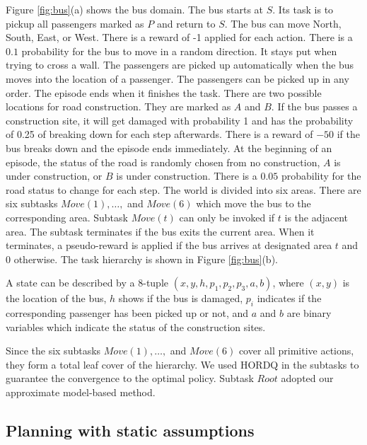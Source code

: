 Figure \ref{fig:bus}(a) shows the bus domain. The bus starts at $S$. Its task
is to pickup all passengers marked as $P$ and return to $S$.
The bus can move North, South, East, or West. There is a reward of -1 applied for each action.
There is a $0.1$ probability for the bus to move in a random direction. It stays put 
when trying to cross a wall. 
The passengers are picked up automatically when the bus moves into
the location of a passenger. The passengers can be picked up in any order.
The episode ends when it finishes the task.  
There are two possible locations for road construction. They are marked as 
$A$ and $B$. If the bus passes a construction site, it will get damaged with probability 1 and has the probability
of 0.25 of breaking down for each step afterwards. There is a reward of $-50$ if the bus breaks down and the episode ends immediately. 
At the beginning of an episode, the status of the road is randomly chosen from no construction, $A$ is under construction,
or $B$ is under construction. There is a $0.05$ probability for the road status to change for each step.
The world is divided into six areas. There are six subtasks $Move(1), \dots,$ and $Move(6)$ which move the
bus to the corresponding area.
Subtask $Move(t)$ can only be invoked if $t$ is the adjacent area.
The subtask terminates if the bus exits the current area.
When it terminates, a pseudo-reward is applied if the bus arrives at designated area $t$ and 0 otherwise.
The task hierarchy is shown in Figure \ref{fig:bus}(b). 

A state can be described by a 8-tuple $(x, y, h, p_1, p_2, p_3, a, b)$, where $(x, y)$ is the location of the bus, $h$ shows if the bus is damaged, $p_i$ indicates if the corresponding passenger has been picked up or not,
and $a$ and $b$ are binary variables which indicate the status of the construction sites.

Since the six subtasks $Move(1), \dots,$ and $Move(6)$ cover all primitive actions, they form a total leaf cover of the hierarchy.
We used HORDQ in the subtasks to guarantee the convergence to the optimal
policy. Subtask $Root$ adopted our approximate model-based method. 


\subsection{Planning with static assumptions}
\label{se:Model}

